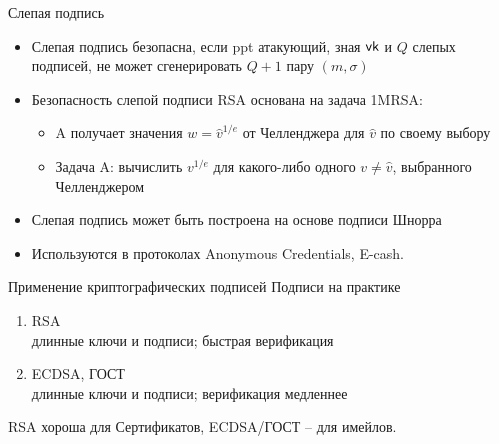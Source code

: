 \documentclass[usenames,dvipsnames,8pt,aspectratio=169]{beamer}
\begin{document}
\begin{frame}{Слепая подпись }

\Large

\begin{itemize}
\itemsep10pt
\item Слепая подпись безопасна, если ppt атакующий, зная $\textsf{vk}$ и $Q$ слепых подписей, не может сгенерировать $Q+1$ пару  $(m, \sigma)$
\item Безопасность слепой подписи RSA основана на задача 1MRSA: \\
\begin{itemize}
	\itemsep5pt
	\large 
	\item {\color{Orange} A} получает значения $w = \hat{v}^{1/e}$ от Челленджера для $\hat{v}$ по своему выбору
	\item Задача {\color{Orange} A}: вычислить $v^{1/e}$ для какого-либо одного $v \neq \hat{v}$, выбранного Челленджером
\end{itemize}	

\item Слепая подпись может быть построена на основе подписи Шнорра
\item Используются в протоколах Anonymous Credentials, E-cash. 
\end{itemize}


\end{frame}

\begin{frame}{Применение криптографических подписей}
\Large
Подписи на практике
\begin{enumerate}
\itemsep 10pt
\item RSA \\
длинные ключи и подписи; быстрая верификация
\item ECDSA, ГОСТ\\
длинные ключи и подписи; верификация медленнее
\end{enumerate}
\vspace{10pt}
RSA хороша для {\color{Orange} Сертификатов}, ECDSA/ГОСТ -- для имейлов. \\[10pt]


\end{frame}
\end{document}
